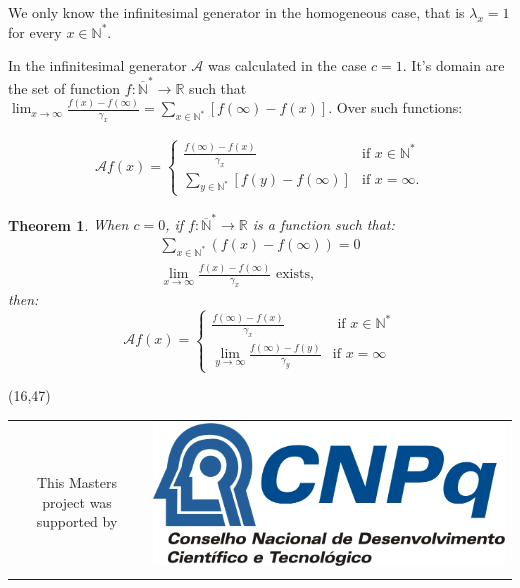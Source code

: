 \documentclass[a1,portrait]{a0poster}
\newtheorem*{teorema}{Theorem}
\newcommand{\AAA}{{\mathcal{A}}}
\newcommand{\Nz}{{\mathbb{N^*}}}
\newcommand{\Nzb}{{\mathbb{\overline{N}^*}}}
\newcommand{\R}{{\mathbb{R}}}
\begin{document}
\begin{textblock}{15}
We only know the infinitesimal generator in the homogeneous case, that
is $\lambda_x = 1$ for every $x \in \Nz$.

In \cite{kendall:56} the infinitesimal generator $\AAA$ was calculated
in the case $c = 1$. It's domain are the set of function $f: \Nzb \to
\R$ such that $\lim_{x \to \infty} \frac{f(x) - f(\infty)}{\gamma_x} =
\sum_{x \in \Nz} [f(\infty) - f(x)]$. Over such functions:

\begin{align*}
  \AAA f (x) = \begin{cases}
    \displaystyle
    \frac{f(\infty) - f(x)}{\gamma_x} & \text{if } x \in \Nz\\
    \displaystyle
    \sum_{y\in \Nz} [ f(y) - f(\infty) ] & \text{if } x = \infty.
  \end{cases}
\end{align*}


\begin{teorema}
  When $c = 0$, if $f: \Nzb \to \R$ is a function such that: 
  \begin{gather*}
    \sum_{x\in \Nz} \left( f(x)-f(\infty)\right) = 0\\
    \lim_{x \to \infty} \frac{f(x) - f(\infty)}{\gamma_x} \textrm{ exists},
  \end{gather*}
  then:
  \begin{displaymath}
    \AAA f(x) = \begin{cases}
      \frac{f(\infty)- f(x)}{\gamma_x} & \text{ if } x \in \Nz \\
      \lim_{y \to \infty} \frac{f(\infty) - f(y)}{\gamma_y} & \text{
        if } x = \infty
    \end{cases}  
  \end{displaymath}
\end{teorema}

\nocite{fontes:08}
\nocite{gabriel:11}


\end{textblock}

\begin{textblock}{15}(16,47)
\begin{center}
  \begin{tabular}{cc}
    & \multirow{2}{*}{\includegraphics[scale = 2.5]{cnpq.jpg}} \\
    This Masters project was supported by & \\ \\
  \end{tabular}
\end{center}
\end{textblock}
\end{document}
